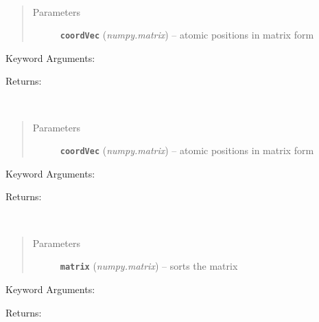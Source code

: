 \documentclass[letterpaper,10pt,english]{sphinxmanual}
\begin{document}

\begin{fulllineitems}
\label{retr:retr.__shiftY}~\begin{quote}\begin{description}
\item[{Parameters}] \leavevmode
\textbf{\texttt{coordVec}} (\emph{numpy.matrix}) -- atomic positions in matrix form

\end{description}\end{quote}

Keyword Arguments:

Returns:

\end{fulllineitems}


\begin{fulllineitems}
\label{retr:retr.__shiftZ}~\begin{quote}\begin{description}
\item[{Parameters}] \leavevmode
\textbf{\texttt{coordVec}} (\emph{numpy.matrix}) -- atomic positions in matrix form

\end{description}\end{quote}

Keyword Arguments:

Returns:

\end{fulllineitems}


\begin{fulllineitems}
\label{retr:retr.__sortMatrix}~\begin{quote}\begin{description}
\item[{Parameters}] \leavevmode
\textbf{\texttt{matrix}} (\emph{numpy.matrix}) -- sorts the matrix

\end{description}\end{quote}

Keyword Arguments:

Returns:

\end{fulllineitems}
\end{document}
